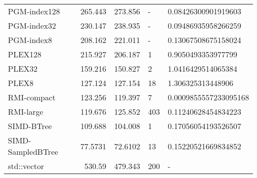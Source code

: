 \begin{tabular}{lrrll}
 PGM-index128      &               265.443  &              273.856  & -            & 0.08426300901919603   \\
 PGM-index32       &               230.147  &              238.935  & -            & 0.09486935958266259   \\
 PGM-index8        &               208.162  &              221.011  & -            & 0.13067508675158024   \\
 PLEX128           &               215.927  &              206.187  & 1            & 0.9050493353977799    \\
 PLEX32            &               159.216  &              150.827  & 2            & 1.0416429514065384    \\
 PLEX8             &               127.124  &              127.154  & 18           & 1.306325313448906     \\
 RMI-compact       &               123.256  &              119.397  & 7            & 0.0009855557233095168 \\
 RMI-large         &               119.676  &              125.852  & 403          & 0.11240628454834223   \\
 SIMD-BTree        &               109.688  &              104.008  & 1            & 0.17056054193526507   \\
 SIMD-SampledBTree &                77.5731 &               72.6102 & 13           & 0.15220521669834852   \\
 std::vector       &               530.59   &              479.343  & 200          & -                     \\
\hline
\end{tabular}